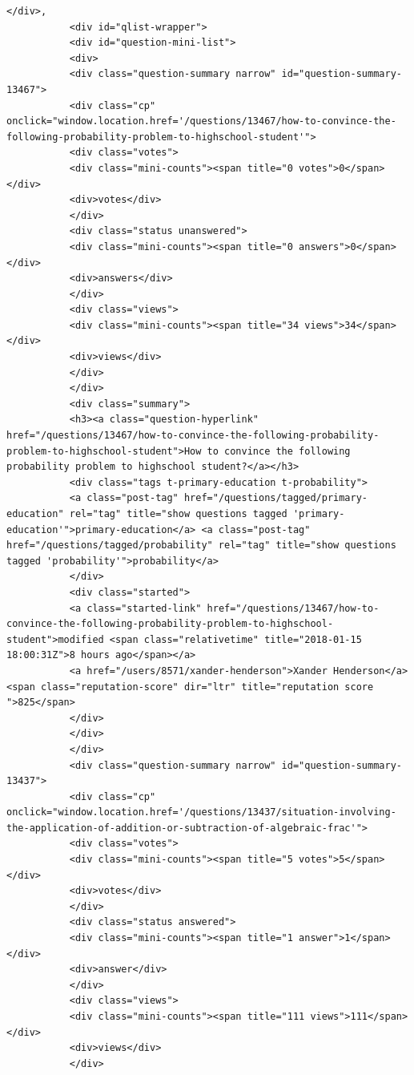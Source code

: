 \documentclass[11pt]{article}
\begin{document}
\begin{Verbatim}[commandchars=\\\{\}]
           </div>,
           <div id="qlist-wrapper">
           <div id="question-mini-list">
           <div>
           <div class="question-summary narrow" id="question-summary-13467">
           <div class="cp" onclick="window.location.href='/questions/13467/how-to-convince-the-following-probability-problem-to-highschool-student'">
           <div class="votes">
           <div class="mini-counts"><span title="0 votes">0</span></div>
           <div>votes</div>
           </div>
           <div class="status unanswered">
           <div class="mini-counts"><span title="0 answers">0</span></div>
           <div>answers</div>
           </div>
           <div class="views">
           <div class="mini-counts"><span title="34 views">34</span></div>
           <div>views</div>
           </div>
           </div>
           <div class="summary">
           <h3><a class="question-hyperlink" href="/questions/13467/how-to-convince-the-following-probability-problem-to-highschool-student">How to convince the following probability problem to highschool student?</a></h3>
           <div class="tags t-primary-education t-probability">
           <a class="post-tag" href="/questions/tagged/primary-education" rel="tag" title="show questions tagged 'primary-education'">primary-education</a> <a class="post-tag" href="/questions/tagged/probability" rel="tag" title="show questions tagged 'probability'">probability</a>
           </div>
           <div class="started">
           <a class="started-link" href="/questions/13467/how-to-convince-the-following-probability-problem-to-highschool-student">modified <span class="relativetime" title="2018-01-15 18:00:31Z">8 hours ago</span></a>
           <a href="/users/8571/xander-henderson">Xander Henderson</a> <span class="reputation-score" dir="ltr" title="reputation score ">825</span>
           </div>
           </div>
           </div>
           <div class="question-summary narrow" id="question-summary-13437">
           <div class="cp" onclick="window.location.href='/questions/13437/situation-involving-the-application-of-addition-or-subtraction-of-algebraic-frac'">
           <div class="votes">
           <div class="mini-counts"><span title="5 votes">5</span></div>
           <div>votes</div>
           </div>
           <div class="status answered">
           <div class="mini-counts"><span title="1 answer">1</span></div>
           <div>answer</div>
           </div>
           <div class="views">
           <div class="mini-counts"><span title="111 views">111</span></div>
           <div>views</div>
           </div>

\end{Verbatim}
\end{document}
